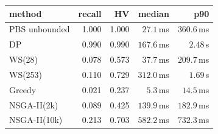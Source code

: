 \setlength{\tabcolsep}{3.5pt}%
\begin{tabular}{lrrrr}
\toprule
method & recall & HV & median & p90 \\
\midrule
PBS unbounded & 1.000 & 1.000 & $27.1$\,ms & $360.6$\,ms \\
DP & 0.990 & 0.990 & $167.6$\,ms & $2.48$\,s \\
WS(28) & 0.078 & 0.573 & $37.7$\,ms & $209.7$\,ms \\
WS(253) & 0.110 & 0.729 & $312.0$\,ms & $1.69$\,s \\
Greedy & 0.021 & 0.237 & $5.3$\,ms & $14.5$\,ms \\
NSGA-II(2k) & 0.089 & 0.425 & $139.9$\,ms & $182.9$\,ms \\
NSGA-II(10k) & 0.213 & 0.703 & $582.2$\,ms & $732.3$\,ms \\
\bottomrule
\end{tabular}
